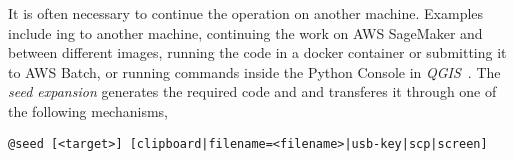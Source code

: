 It is often necessary to continue the operation on another machine. Examples include ing to another machine, continuing the work on AWS SageMaker and between different images, running the code in a docker container or submitting it to AWS Batch, or running commands inside the Python Console in \emph{QGIS}~\cite{QGIS_python_console}. The \emph{seed expansion} generates the required code and and transferes it through one of the following mechanisms,
%
\begin{verbatim}
@seed [<target>] [clipboard|filename=<filename>|usb-key|scp|screen]
\end{verbatim}